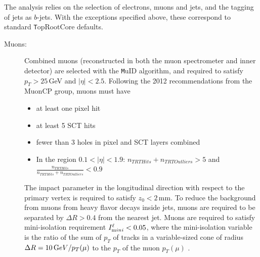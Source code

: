 The analysis relies on the selection of electrons, muons and jets, and
the tagging of jets as $b$-jets. With the exceptions specified above, these correspond to standard {\texttt TopRootCore} defaults.
\begin{description}
\item[Muons:] Combined muons (reconstructed in both the muon spectrometer
and inner detector) are selected with the {\texttt MuID} algorithm, and 
required to satisfy $p_T>25$\,GeV and $|\eta|<2.5$.  Following the 2012 recommendations from the MuonCP group, muons must have
\begin{itemize}
\item at least one pixel hit
\item at least 5 SCT hits
\item fewer than 3 holes in pixel and SCT layers combined
\item In the region $0.1 < |\eta| < 1.9 $: $n_{TRT Hits} + n_{TRT Outliers} > 5$ and $\frac{n_{TRT Hits}}{n_{TRT Hits} + n_{TRT Outliers}} < 0.9$
\end{itemize}

The impact parameter
in the longitudinal direction with respect to the primary vertex is
required to satisfy $z_0<2$\,mm.  To reduce the background from
muons from heavy flavor decays inside jets, muons are required to be
separated by $\Delta R>0.4$ from the nearest jet. Muons are required to satisfy 
mini-isolation requirement $I^\ell_{\textrm mini}<0.05$, where
the mini-isolation variable is the ratio of the sum of $p_T$ of tracks
in a variable-sized cone of radius $\Delta R=10\,{\textrm GeV}/p_T(\mu)$ to the $p_T$ of the muon $p_T(\mu)$ \cite{topreco}. %


\end{description}
